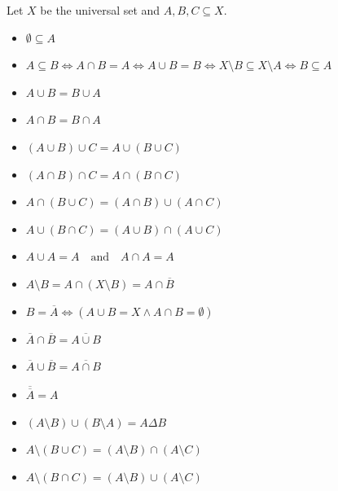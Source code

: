 Let \(X\) be the universal set and \(A, B, C \subseteq X\).

\begin{itemize}

	\item \(\emptyset \subseteq A\)

	\item \(A \subseteq B \iff A \cap B = A \iff A \cup B = B \iff X \setminus B \subseteq X
	      \setminus A \iff B \subseteq A\)

	\item \(A \cup B = B \cup A\)

	\item \(A \cap B = B \cap A\)

	\item \((A \cup B) \cup C = A \cup (B \cup C)\)

	\item \((A \cap B) \cap C = A \cap (B \cap C)\)

	\item \(A \cap (B \cup C) = (A \cap B) \cup (A \cap C)\)

	\item \(A \cup (B \cap C) = (A \cup B) \cap (A \cup C)\)

	\item \(A \cup A = A \quad \text{and} \quad A \cap A = A\)

	\item \(A \setminus B = A \cap (X \setminus B) = A \cap \overline{B}\)

	\item \(B = \overline{A} \iff (A \cup B = X \land A \cap B = \emptyset)\)

	\item \(\overline{A} \cap \overline{B} = \overline{A \cup B}\)

	\item \(\overline{A} \cup \overline{B} = \overline{A \cap B}\)

	\item \(\overline{\overline{A}} = A\)

	\item \((A \setminus B) \cup (B \setminus A) = A \Delta B\)

	\item \(A \setminus (B \cup C) = (A \setminus B) \cap (A \setminus C) \)

	\item \(A \setminus (B \cap C) = (A \setminus B) \cup (A \setminus C) \)

\end{itemize}

